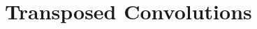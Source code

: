 \documentclass[11pt,compress,t,notes=noshow]{beamer}
\begin{document}

  


%
%
%


\section{Transposed Convolutions}
\end{document}
